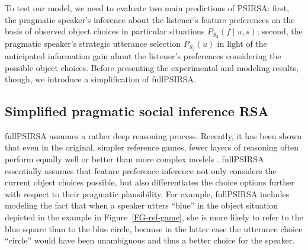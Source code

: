 \documentclass[10pt,a4paper]{article}
\begin{document}
To test our model, we need to evaluate two main predictions of PSIRSA:  
first, the pragmatic speaker's inference about the listener's feature preferences on the basis of observed object choices in particular situations $P_{S_{2}}(f\mid u,s)$; 
second, the pragmatic speaker's strategic utterance selection $P_{S_2}(u)$ in light of the anticipated information gain about the listener's preferences considering the possible object choices.
Before presenting the experimental and modeling results, though, we introduce a simplification of fullPSIRSA. 


\subsection{Simplified pragmatic social inference RSA}

fullPSIRSA assumes a rather deep reasoning process. 
Recently, it has been shown that even in the original, simpler reference games, fewer layers of reasoning often perform equally well or better than more complex models \cite{sikos2019}.
fullPSIRSA essentially assumes that feature preference inference not only considers the current object choices possible, but also differentiates the choice options further with respect to their pragmatic plausibility. 
For example, fullPSIRSA includes modeling the fact that when a speaker utters ``blue'' in the object situation depicted in the example in Figure~\ref{FG-ref-game}, she is more likely to refer to the blue square than to the blue circle, because in the latter case the utterance choice ``circle'' would have been unambiguous and thus a better choice for the speaker.
\end{document}
